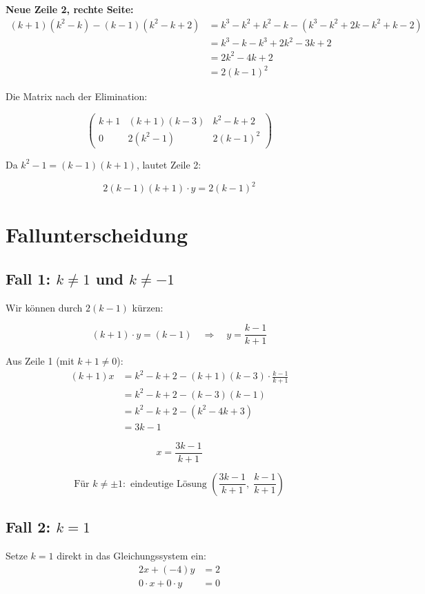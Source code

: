 \documentclass[a4paper,12pt]{article}
\begin{document}
\textbf{Neue Zeile 2, rechte Seite:}
\begin{align*}
(k+1)(k^2-k) - (k-1)(k^2-k+2) &= k^3 - k^2 + k^2 - k - (k^3 - k^2 + 2k - k^2 + k - 2) \\
&= k^3 - k - k^3 + 2k^2 - 3k + 2 \\
&= 2k^2 - 4k + 2 \\
&= 2(k-1)^2
\end{align*}

Die Matrix nach der Elimination:

\[
\left(\begin{array}{cc|c}
k+1 & (k+1)(k-3) & k^2-k+2 \\
0 & 2(k^2-1) & 2(k-1)^2
\end{array}\right)
\]

Da $k^2-1 = (k-1)(k+1)$, lautet Zeile 2:

\[
2(k-1)(k+1) \cdot y = 2(k-1)^2
\]

\section*{Fallunterscheidung}

\subsection*{Fall 1: $k \neq 1$ und $k \neq -1$}

Wir können durch $2(k-1)$ kürzen:

\[
(k+1) \cdot y = (k-1) \quad \Rightarrow \quad y = \frac{k-1}{k+1}
\]

Aus Zeile 1 (mit $k+1 \neq 0$):
\begin{align*}
(k+1)x &= k^2-k+2 - (k+1)(k-3) \cdot \frac{k-1}{k+1} \\
&= k^2-k+2 - (k-3)(k-1) \\
&= k^2-k+2 - (k^2-4k+3) \\
&= 3k - 1
\end{align*}

\[
x = \frac{3k-1}{k+1}
\]

\[
\boxed{\text{Für } k \neq \pm 1: \text{ eindeutige Lösung } \left(\frac{3k-1}{k+1},\; \frac{k-1}{k+1}\right)}
\]

\subsection*{Fall 2: $k = 1$}

Setze $k = 1$ direkt in das Gleichungssystem ein:
\begin{align*}
2x + (-4)y &= 2 \\
0 \cdot x + 0 \cdot y &= 0
\end{align*}
\end{document}
